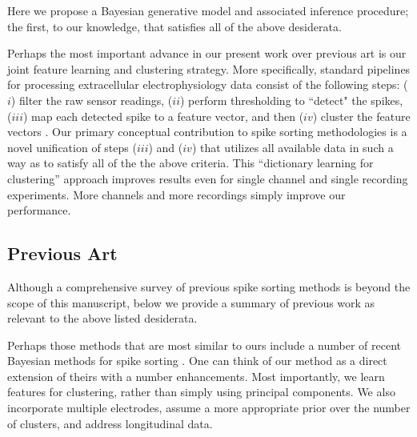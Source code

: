 \documentclass[journal]{IEEEtran}
\begin{document}
Here we propose a Bayesian generative model and associated inference procedure; the first, to our knowledge, that satisfies all of the above desiderata.

Perhaps the most important advance in our present work over previous art is our joint feature learning and clustering strategy.  More specifically, 
% 
standard pipelines for processing extracellular electrophysiology data consist of the following steps:
($i$) filter the raw sensor readings, 
($ii$) perform thresholding to ``detect" the spikes, 
($iii$) map each detected spike to a feature vector, and then
($iv$)  cluster the feature vectors
\cite{Lewicki}. 
Our primary conceptual contribution to spike sorting methodologies is a novel unification of steps ($iii$) and ($iv$) that utilizes all available data in such a way as to satisfy all of the the above criteria. This ``dictionary learning for clustering'' approach improves results even for single channel and single recording experiments.  More channels and more recordings simply improve our performance.

\subsection{Previous Art} %
\label{sec:background}

Although a comprehensive survey of previous spike sorting methods is beyond the scope of this manuscript, below we provide a summary of previous work as relevant to the above listed desiderata.

Perhaps those methods that are most similar to ours include a number of recent Bayesian methods for spike sorting \cite{Wood2009,Bo2011}.  One can think of our method as a direct extension of theirs with a number enhancements. Most importantly, we learn features for clustering, rather than simply using principal components. We also incorporate multiple electrodes,  assume a more appropriate prior over the number of clusters, and address longitudinal data.

\end{document}

